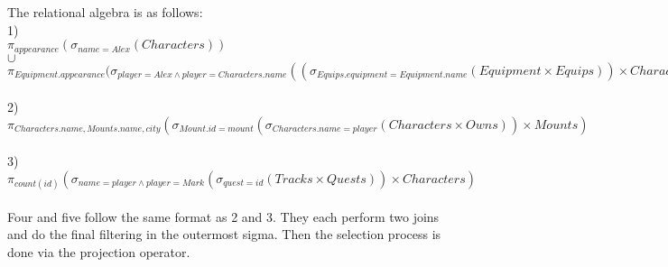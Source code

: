 \documentclass[12pt, letterpaper]{article}
\begin{document}
\newpage

The relational algebra is as follows: \\
1) \\
\footnotesize{$\pi_{appearance}(\sigma_{name=Alex}(Characters))$ \\
$\cup$\\
$\pi_{Equipment.appearance}(\sigma_{player=Alex \wedge player=Characters.name}((\sigma_{Equips.equipment=Equipment.name}(Equipment \times Equips))\times Characters)$} \\ \\
2) \\
\footnotesize{$\pi_{Characters.name, Mounts.name, city}(\sigma_{Mount.id=mount}(\sigma_{Characters.name=player}(Characters \times Owns))\times Mounts)$} \\ \\
3) \\
\footnotesize{$\pi_{count(id)}(\sigma_{name=player \wedge player=Mark}(\sigma_{quest=id}(Tracks \times Quests))\times Characters)$}
\\ \\

Four and five follow the same format as 2 and 3. They each perform two joins and do the final filtering in the outermost sigma. Then the selection process is done via the projection operator.
\end{document}

